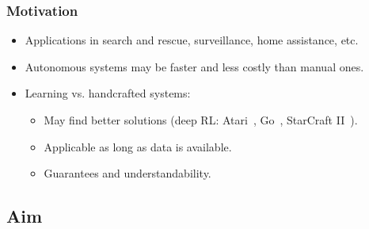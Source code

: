 \begin{frame}
    \frametitle{Motivation}
    
    \begin{itemize}
        \item Applications in search and rescue, surveillance, home assistance, etc.
        \item Autonomous systems may be faster and less costly than manual ones.
        \item Learning vs. handcrafted systems:
        \begin{itemize}
            \item May find better solutions (deep RL: Atari~\cite{mnih_human-level_2015}, Go~\cite{silver_mastering_2016}, StarCraft II~\cite{vinyals_grandmaster_2019}).
            \item Applicable as long as data is available.
            \item Guarantees and understandability.
        \end{itemize}
    \end{itemize}
\end{frame}

\subsection{Aim}

